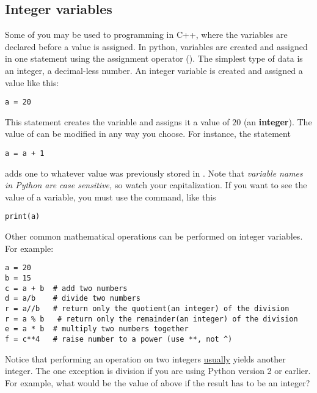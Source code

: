 \subsection*{Integer variables}
Some of you may be used to programming in C++, where
the variables are declared before a value is assigned.  In python,
variables are created and assigned in one statement using the
assignment operator (\code{=}).  The simplest type of data is an
integer, a decimal-less number.  An integer variable is created and
assigned a value like this:
\begin{Verbatim}
a = 20
\end{Verbatim}
This statement creates the variable  and assigns it a value of
$20$ (an \textbf{integer}).  The value of  can be modified in
any way you choose.  For instance, the statement
\begin{Verbatim}
a = a + 1
\end{Verbatim}
adds one to whatever value was previously stored in
.   Note that {\it variable names
  in Python are case sensitive,} so watch your capitalization.
 If you want to see the value of a variable, you
must use the  command, like this
\begin{Verbatim}
print(a)
\end{Verbatim}

Other common mathematical operations can be performed on integer
variables.  For example:
\begin{Verbatim}
a = 20
b = 15
c = a + b  # add two numbers
d = a/b    # divide two numbers
r = a//b   # return only the quotient(an integer) of the division
r = a % b   # return only the remainder(an integer) of the division
e = a * b  # multiply two numbers together
f = c**4   # raise number to a power (use **, not ^)
\end{Verbatim}
Notice that performing an operation on two integers \ul{usually}
yields another integer.  The one exception is division if you are
using Python version 2 or earlier.  For
example, what would be the value of  above if the result has
to be an integer?

